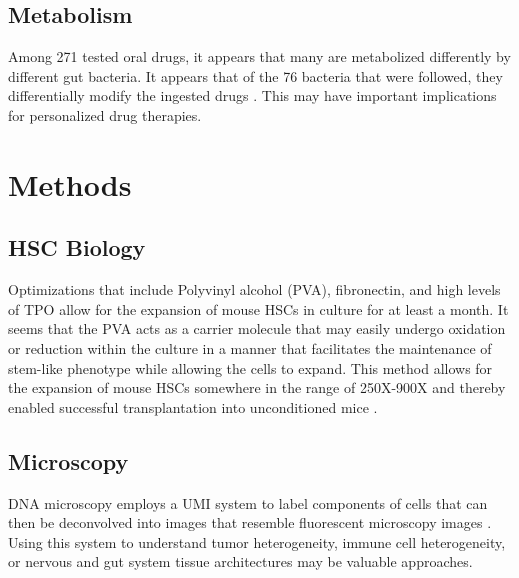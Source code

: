 \documentclass[]{book}
\begin{document}
\hypertarget{metabolism}{%
\section{Metabolism}\label{metabolism}}

Among 271 tested oral drugs, it appears that many are metabolized differently by different gut bacteria. It appears that of the 76 bacteria that were followed, they differentially modify the ingested drugs \citep{zimmermann2019mapping}. This may have important implications for personalized drug therapies.

\hypertarget{methods}{%
\chapter{Methods}\label{methods}}

\hypertarget{hsc-biology}{%
\section{HSC Biology}\label{hsc-biology}}

Optimizations that include Polyvinyl alcohol (PVA), fibronectin, and high levels of TPO allow for the expansion of mouse HSCs in culture for at least a month. It seems that the PVA acts as a carrier molecule that may easily undergo oxidation or reduction within the culture in a manner that facilitates the maintenance of stem-like phenotype while allowing the cells to expand. This method allows for the expansion of mouse HSCs somewhere in the range of 250X-900X and thereby enabled successful transplantation into unconditioned mice \citep{wilkinson2019long}.

\hypertarget{microscopy}{%
\section{Microscopy}\label{microscopy}}

DNA microscopy employs a UMI system to label components of cells that can then be deconvolved into images that resemble fluorescent microscopy images \citep{weinstein2019dna}. Using this system to understand tumor heterogeneity, immune cell heterogeneity, or nervous and gut system tissue architectures may be valuable approaches.


\end{document}
